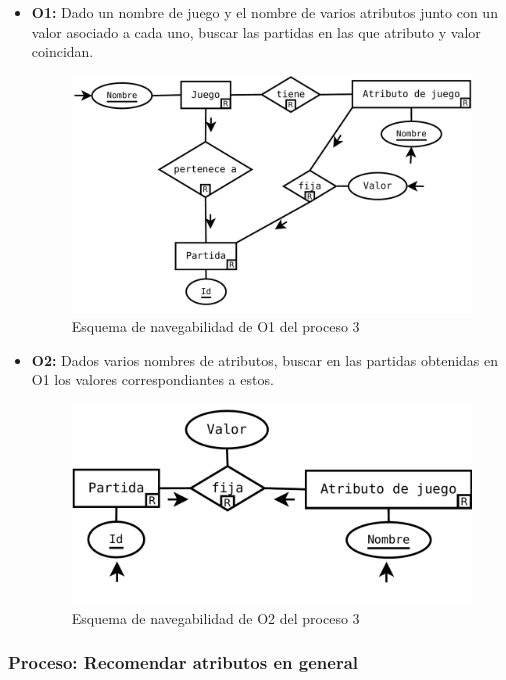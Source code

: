 \begin{itemize}
	\item \textbf{O1:} Dado un nombre de juego y el nombre de varios
		atributos junto con un valor asociado a cada uno, 
		buscar las partidas en las que atributo y valor coincidan.\\

	\begin{figure}[H]
		\centering
		\includegraphics[width=0.5\linewidth]{../Diagramas/pdf/Op3-1.pdf}
		\caption{Esquema de navegabilidad de O1 del proceso 3}
	\end{figure}


	\item \textbf{O2:} Dados varios nombres de atributos, buscar en las
		partidas obtenidas en O1 los valores correspondiantes a
		estos.\\

	\begin{figure}[H]
		\centering
		\includegraphics[width=0.5\linewidth]{../Diagramas/pdf/Op3-2.pdf}
		\caption{Esquema de navegabilidad de O2 del proceso 3}
	\end{figure}
\end{itemize}





\subsubsection{Proceso: Recomendar atributos en general}

